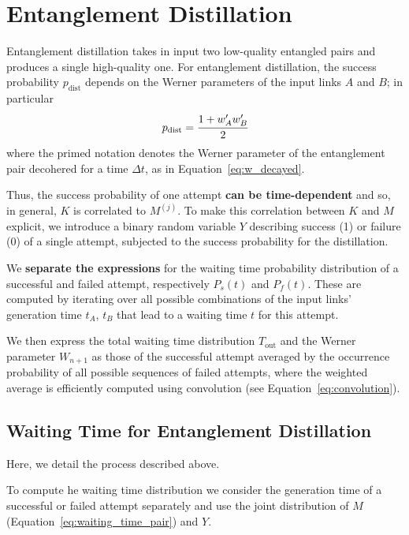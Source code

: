 \documentclass{masterthesis}
\begin{document}

\section{Entanglement Distillation}

Entanglement distillation takes in input two low-quality entangled pairs and produces a single high-quality one.
For entanglement distillation, the success probability $p_\text{dist}$ depends on the Werner parameters of the input links $A$ and $B$; in particular
\begin{equation}
    p_\text{dist} = \cfrac{1+w_A'w_B'}{2}
\end{equation}
where the primed notation denotes the Werner parameter of the entanglement pair decohered for a time $\Delta t$, as in Equation~\ref{eq:w_decayed}.

Thus, the success probability of one attempt \textbf{can be time-dependent} and so, in general, $K$ is correlated to $M^{(j)}$.
To make this correlation between $K$ and $M$ explicit, we introduce a binary random variable $Y$ describing success (1) or failure (0) of a single attempt, subjected to the success probability for the distillation.

We \textbf{separate the expressions} for the waiting time probability distribution of a successful and failed attempt, respectively $P_s(t)$ and $P_f(t)$.
These are computed by iterating over all possible combinations of the input links' generation time $t_A$, $t_B$ that lead to a waiting time $t$ for this attempt.

We then express the total waiting time distribution $T_\text{out}$ and the Werner parameter $W_{n+1}$ as those of the successful attempt averaged by the occurrence probability of all possible sequences of failed attempts, where the weighted average is efficiently computed using convolution (see Equation~\ref{eq:convolution}).

\subsection{Waiting Time for Entanglement Distillation}

Here, we detail the process described above.

To compute he waiting time distribution we consider the generation time of a successful or failed attempt separately and use the joint distribution of $M$ (Equation~\ref{eq:waiting_time_pair}) and $Y$.
\end{document}
